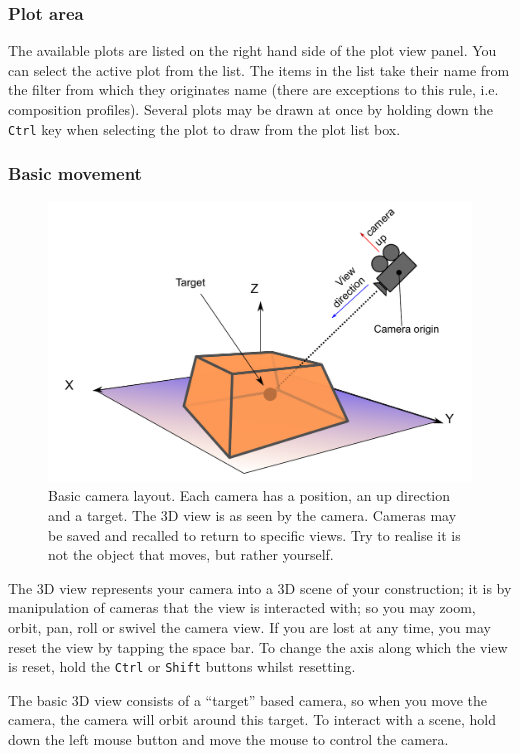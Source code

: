 \documentclass[10pt]{article}
\begin{document}
\subsubsection{Plot area}
The available plots are listed on the right hand side of the plot view panel. You can select the active plot from the list. The items in the list take their name from the filter from which they originates name (there are exceptions to this rule, i.e. composition profiles). Several plots may be drawn at once by holding down the \texttt{Ctrl} key when selecting the plot to draw from the plot list box. 


\subsubsection{Basic movement}
\begin{figure}[ht]
\centering
 \includegraphics[width=0.45 \textwidth,keepaspectratio=true]{./figures/camera.pdf}

 \caption{Basic camera layout. Each camera has a position, an up direction and a target. The 3D view is as seen by the camera. Cameras may be saved and recalled to return to specific views. Try to realise it is not the object that moves, but rather yourself.}
 \label{fig:camera-basics}
\end{figure}
The 3D view represents your camera into a 3D scene of your construction; it is by manipulation of cameras that the view is interacted with; so you may zoom, orbit, pan, roll or swivel the camera view. If you are lost at any time, you may reset the view by tapping the space bar. To change the axis along which the view is reset, hold the \texttt{Ctrl} or \texttt{Shift} buttons whilst resetting.  

The basic 3D view consists of a ``target'' based camera, so when you move the camera, the camera will orbit around this target. To interact with a scene, hold down the left mouse button and move the mouse to control the camera.  
\end{document}
